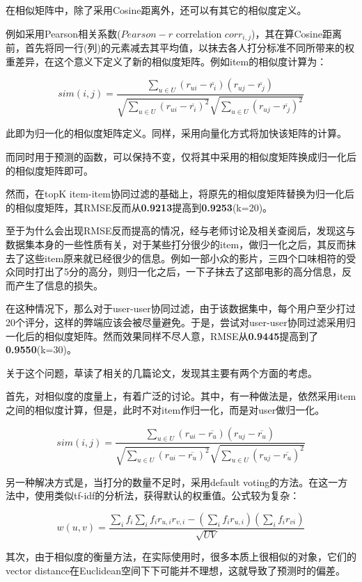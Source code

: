 \documentclass[utf8, a4paper, 11pt, onecolumn]{ctexart}
\begin{document}
\begin{spacing}{1.25}
在相似矩阵中，除了采用Cosine距离外，还可以有其它的相似度定义。

例如采用Pearson相关系数($Pearson-r$ correlation $corr_{i,j}$)\cite{sarwar2001item}，其在算Cosine距离前，首先将同一行(列)的元素减去其平均值，以抹去各人打分标准不同所带来的权重差异，在这个意义下定义了新的相似度矩阵。例如item的相似度计算为：

\[sim(i,j) = \frac{\sum_{u \in U} (r_{ui}-\overline{r_{i}})  (r_{uj}-\overline{r_{j}})} {\sqrt{\sum_{u \in U} (r_{ui}-\overline{r_{i}})^2} \sqrt{\sum_{u \in U} (r_{uj}-\overline{r_{j}})^2}}\]

此即为归一化的相似度矩阵定义。同样，采用向量化方式将加快该矩阵的计算。

而同时用于预测的函数，可以保持不变，仅将其中采用的相似度矩阵换成归一化后的相似度矩阵即可。

然而，在topK item-item协同过滤的基础上，将原先的相似度矩阵替换为归一化后的相似度矩阵，其RMSE反而从\textbf{0.9213}提高到\textbf{0.9253}(k=20)。

至于为什么会出现RMSE反而提高的情况，经与老师讨论及相关查阅后，发现这与数据集本身的一些性质有关，对于某些打分很少的item，做归一化之后，其反而抹去了这些item原来就已经很少的信息。例如一部小众的影片，三四个口味相符的受众同时打出了5分的高分，则归一化之后，一下子抹去了这部电影的高分信息，反而产生了信息的损失。

在这种情况下，那么对于user-user协同过滤，由于该数据集中，每个用户至少打过20个评分，这样的弊端应该会被尽量避免。于是，尝试对user-user协同过滤采用归一化后的相似度矩阵。然而效果同样不尽人意，RMSE从\textbf{0.9445}提高到了\textbf{0.9550}(k=30)。

关于这个问题，草读了相关的几篇论文，发现其主要有两个方面的考虑。

首先，对相似度的度量上，有着广泛的讨论。其中，有一种做法是，依然采用item之间的相似度计算，但是，此时不对item作归一化，而是对user做归一化\cite{sarwar2001item}。

\[sim(i,j) = \frac{\sum_{u \in U} (r_{ui}-\overline{r_{u}})  (r_{uj}-\overline{r_{u}})} {\sqrt{\sum_{u \in U} (r_{ui}-\overline{r_{u}})^2} \sqrt{\sum_{u \in U} (r_{uj}-\overline{r_{u}})^2}}\]

另一种解决方式是，当打分的数量不足时，采用default voting的方法\cite{breese1998empirical}。在这一方法中，使用类似tf-idf的分析法，获得默认的权重值。公式较为复杂：

\[w(u,v) = \frac{\sum_{i} f_{i} \sum_{i} f_{i} r_{u,i} r_{v,i} - (\sum_i f_i r_{u,i}) (\sum_i f_i r_{vi}) }{\sqrt{UV}}\]

其次，由于相似度的衡量方法，在实际使用时，很多本质上很相似的对象，它们的vector distance在Euclidean空间下下可能并不理想\cite{sarwar2001item}，这就导致了预测时的偏差。


\end{spacing}
\end{document}

